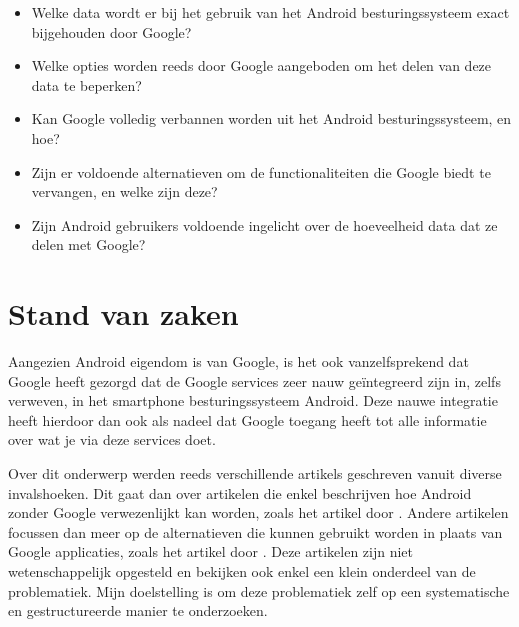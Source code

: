 \begin{itemize}
	\item Welke data wordt er bij het gebruik van het Android besturingssysteem exact bijgehouden door Google?
	\item Welke opties worden reeds door Google aangeboden om het delen van deze data te beperken?
	\item Kan Google volledig verbannen worden uit het Android besturingssysteem, en hoe?
	\item Zijn er voldoende alternatieven om de functionaliteiten die Google biedt te vervangen, en welke zijn deze?
	\item Zijn Android gebruikers voldoende ingelicht over de hoeveelheid data dat ze delen met Google?
\end{itemize}



\section{Stand van zaken}
\label{sec:state-of-the-art}

Aangezien Android eigendom is van Google, is het ook vanzelfsprekend dat Google heeft gezorgd dat de Google services zeer nauw geïntegreerd zijn in, zelfs verweven, in het smartphone besturingssysteem Android. Deze nauwe integratie heeft hierdoor dan ook als nadeel dat Google toegang heeft tot alle informatie over wat je via deze services doet.

\vspace{3mm}

\noindent Over dit onderwerp werden reeds verschillende artikels geschreven vanuit diverse invalshoeken. Dit gaat dan over artikelen die enkel beschrijven hoe Android zonder Google verwezenlijkt kan worden, zoals het artikel door \autocite{BertelKing2016}. Andere artikelen focussen dan meer op de alternatieven die kunnen gebruikt worden in plaats van Google applicaties, zoals het artikel door \autocite{EricFerrari2017}. Deze artikelen zijn niet wetenschappelijk opgesteld en bekijken ook enkel een klein onderdeel van de problematiek. Mijn doelstelling is om deze problematiek zelf op een systematische en gestructureerde manier te onderzoeken.

